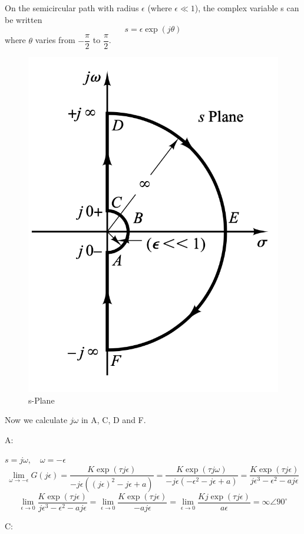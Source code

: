 On the semicircular path with radius $\epsilon$ (where $\epsilon \ll 1 $), the complex variable s can be written
$$
s = \epsilon \exp(j\theta)
$$
where $\theta$ varies from $-\dfrac{\pi}{2}$ to $\dfrac{\pi}{2}$.
\begin{figure}[H]
	\caption{s-Plane}
	\centering
	\includegraphics[width=12cm]{../Figure/Q2/nyquist_s_plane_name.png}
\end{figure}
Now we calculate $j\omega$ in A, C, D and F.

A:

$s = j\omega,\quad \omega = -\epsilon$
$$
 \lim_{\omega\to -\epsilon}G(j\epsilon)  = \dfrac{K\exp(\tau j\epsilon)}{-j\epsilon((j\epsilon)^2 - j\epsilon + a)} = \dfrac{K\exp(\tau j\omega)}{-j\epsilon(-\epsilon^2 - j\epsilon + a)} = \dfrac{K\exp(\tau j\epsilon)}{j\epsilon^3 - \epsilon^2 - aj\epsilon}
$$
$$
\lim_{\epsilon \to 0}\dfrac{K\exp(\tau j\epsilon)}{j\epsilon^3 - \epsilon^2 - aj\epsilon} = \lim_{\epsilon \to 0} \dfrac{K\exp(\tau j\epsilon)}{-aj\epsilon} = \lim_{\epsilon \to 0} \dfrac{Kj\exp(\tau j\epsilon)}{a\epsilon} =  \infty \angle 90^{\circ}
$$

C:

